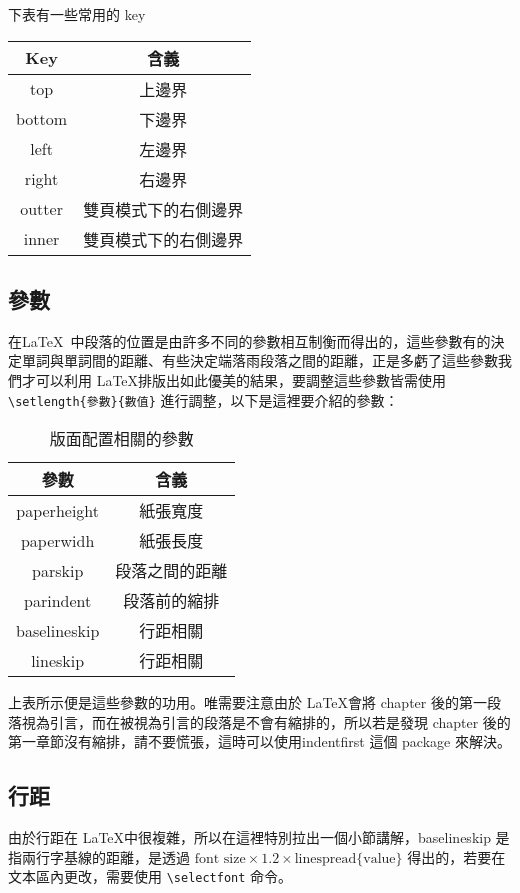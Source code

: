 下表有一些常用的 key

\begin{tabular}{cc}
\hline
Key & 含義 \\\hline\hline
top & 上邊界 \\\hline
bottom & 下邊界 \\\hline
left & 左邊界 \\\hline
right & 右邊界 \\\hline
outter & 雙頁模式下的右側邊界 \\\hline
inner & 雙頁模式下的右側邊界 \\\hline
\end{tabular}

\subsection{參數}

在\LaTeX\ 中段落的位置是由許多不同的參數相互制衡而得出的，這些參數有的決定單詞與單詞間的距離、有些決定端落雨段落之間的距離，正是多虧了這些參數我們才可以利用 \LaTeX 排版出如此優美的結果，要調整這些參數皆需使用 \verb|\setlength{參數}{數值}| 進行調整，以下是這裡要介紹的參數：

\begin{table}[hbt]
\begin{tabular}{|c|c|}
\hline
參數 & 含義
\\\hline\hline
paperheight & 紙張寬度
\\\hline
paperwidh & 紙張長度
\\\hline
parskip & 段落之間的距離
\\\hline
parindent & 段落前的縮排
\\\hline
baselineskip & 行距相關
\\\hline
lineskip & 行距相關
\\\hline
\end{tabular}
\caption{版面配置相關的參數}
\label{tab:layout}
\end{table}

上表所示便是這些參數的功用。唯需要注意由於 \LaTeX 會將 chapter 後的第一段落視為引言，而在被視為引言的段落是不會有縮排的，所以若是發現 chapter 後的第一章節沒有縮排，請不要慌張，這時可以使用indentfirst 這個 package 來解決。

\subsection{行距}

由於行距在 \LaTeX 中很複雜，所以在這裡特別拉出一個小節講解，baselineskip 是指兩行字基線的距離，是透過 $\text{font size} \times 1.2 \times \text{linespread\{value\}}$ 得出的，若要在文本區內更改，需要使用 \verb|\selectfont| 命令。

